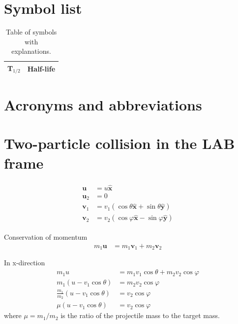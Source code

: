 \documentclass[twoside,english]{uiofysmaster/uiofysmaster}
\begin{document}
\begin{appendices}

\chapter{Symbol list}

\begin{table}[h]
  \centering
  \caption{Table of symbols with explanations.}
    \begin{tabular}{ll}
        \hline
        T$_{1/2}$ & Half-life \\
        \hline
    \end{tabular}
    \label{tab:symbols}
\end{table}


\chapter{Acronyms and abbreviations}

\begin{table}[ht] 
	\centering 
	
\end{table}


\chapter{Two-particle collision in the LAB frame}


\begin{align}\label{eq:2p-LAB-collision}
\begin{split}
	 \boldsymbol{u} &= u \boldsymbol{\hat{x}}  \\
	 \boldsymbol{u}_2 &= 0  \\
	 \boldsymbol{v}_1 &= v_1 (\cos \theta \boldsymbol{\hat{x}} + \sin \theta \boldsymbol{\hat{y}})  \\
	\boldsymbol{v}_2 &= v_2 (\cos \varphi \boldsymbol{\hat{x}} - \sin \varphi \boldsymbol{\hat{y}})
\end{split}
\end{align}

Conservation of momentum
\begin{align*}%
	m_1 \boldsymbol{u} &= m_1 \boldsymbol{v}_1 + m_2 \boldsymbol{v}_2
\end{align*}

In x-direction
\begin{align}\label{eq:comx}
	m_1 u &= m_1 v_1 \cos \theta + m_2 v_2 \cos \varphi  \nonumber\\
	m_1 (u - v_1 \cos \theta) &= m_2 v_2 \cos \varphi  \nonumber\\
	\frac{m_1}{m_2} (u - v_1 \cos \theta) &= v_2 \cos \varphi  \nonumber\\
	\mu (u - v_1 \cos \theta) &= v_2 \cos \varphi
\end{align}
where $\mu = m_1/m_2$ is the ratio of the projectile mass to the target mass.


\end{appendices}
\end{document}
